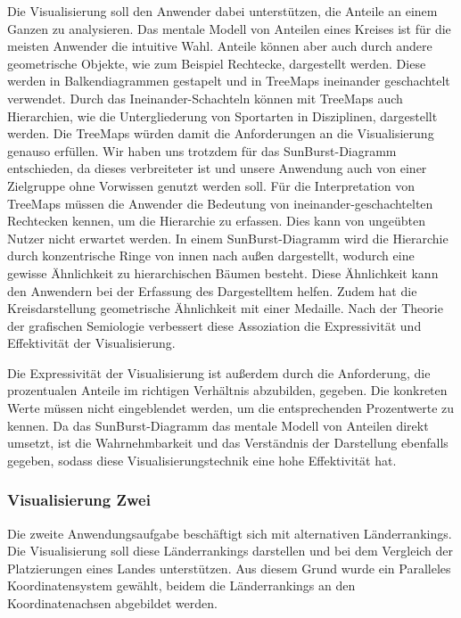 Die Visualisierung soll den Anwender dabei unterstützen, die Anteile an einem Ganzen zu analysieren. Das mentale Modell von Anteilen eines Kreises ist für die meisten Anwender die intuitive Wahl. Anteile können aber auch durch andere geometrische Objekte, wie zum Beispiel Rechtecke, dargestellt werden. Diese werden in Balkendiagrammen gestapelt und in TreeMaps ineinander geschachtelt verwendet. Durch das Ineinander-Schachteln können mit TreeMaps auch Hierarchien, wie die Untergliederung von Sportarten in Disziplinen, dargestellt werden. Die TreeMaps würden damit die Anforderungen an die Visualisierung genauso erfüllen. Wir haben uns trotzdem für das SunBurst-Diagramm entschieden, da dieses verbreiteter ist und unsere Anwendung auch von einer Zielgruppe ohne Vorwissen genutzt werden soll. Für die Interpretation von TreeMaps müssen die Anwender die Bedeutung von ineinander-geschachtelten Rechtecken kennen, um die Hierarchie zu erfassen. Dies kann von ungeübten Nutzer nicht erwartet werden. In einem SunBurst-Diagramm wird die Hierarchie durch konzentrische Ringe von innen nach außen dargestellt, wodurch eine gewisse Ähnlichkeit zu hierarchischen Bäumen besteht. Diese Ähnlichkeit kann den Anwendern bei der Erfassung des Dargestelltem helfen. Zudem hat die Kreisdarstellung geometrische Ähnlichkeit mit einer Medaille. Nach der Theorie der grafischen Semiologie \cite{bertin} verbessert diese Assoziation die Expressivität und Effektivität der Visualisierung. 
 
Die Expressivität der Visualisierung ist außerdem durch die  Anforderung, die prozentualen Anteile im richtigen Verhältnis abzubilden, gegeben. Die konkreten Werte müssen nicht eingeblendet werden, um die entsprechenden Prozentwerte zu kennen. Da das SunBurst-Diagramm das mentale Modell von Anteilen direkt umsetzt, ist die Wahrnehmbarkeit und das Verständnis der Darstellung ebenfalls gegeben, sodass diese Visualisierungstechnik eine hohe Effektivität hat.

\subsubsection{Visualisierung Zwei}
Die zweite Anwendungsaufgabe beschäftigt sich mit alternativen Länderrankings. Die Visualisierung soll diese Länderrankings darstellen und bei dem Vergleich der Platzierungen eines Landes unterstützen. Aus diesem Grund wurde ein Paralleles Koordinatensystem gewählt, beidem die Länderrankings an den Koordinatenachsen abgebildet werden.

